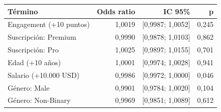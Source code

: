 \begin{tabular}{lrrr}
\toprule
Término & Odds ratio & IC 95\% & p \\
\midrule
Engagement (+10 puntos) & 1,0019 & [0,9987; 1,0052] & 0,245 \\
Suscripción: Premium & 0,9990 & [0,9878; 1,0103] & 0,862 \\
Suscripción: Pro & 1,0025 & [0,9897; 1,0155] & 0,701 \\
Edad (+10 años) & 1,0001 & [0,9974; 1,0028] & 0,941 \\
Salario (+10.000 USD) & 0,9986 & [0,9972; 1,0000] & 0,046 \\
Género: Male & 0,9901 & [0,9784; 1,0020] & 0,104 \\
Género: Non-Binary & 0,9969 & [0,9851; 1,0089] & 0,612 \\
\bottomrule
\end{tabular}
